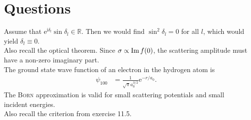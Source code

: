 \documentclass[english, parskip=full]{scrartcl}
\title{\titel}
\author{\autor}
\date{\today}
\newcommand{\tecxt}{}
\def\I{\text{i}}
\def\e{\text{e}}
\begin{document}
\maketitle  %
\section{Questions}
Assume that $\e^{\I\delta_l}\sin\delta_l\in\mathbb{R}$. 
Then we would find $\sin^2\delta_l=0$ for all $l$, which would yield $\delta_l\equiv 0$.
\\
Also recall the optical theorem.
Since $\sigma\propto \tecxt\text{Im\,}f(0)$, the scattering amplitude must have a non-zero imaginary part.
\\
The ground state wave function of an electron in the hydrogen atom is
\begin{align}
\psi_{100}&=\frac{1}{\sqrt{\pi}a_0^{3/2}}\e^{-r/a_0}.
\end{align}
The \textsc{Born} approximation is valid for small scattering potentials and small incident energies.
\\
Also recall the criterion from exercise 11.5.
\end{document}
